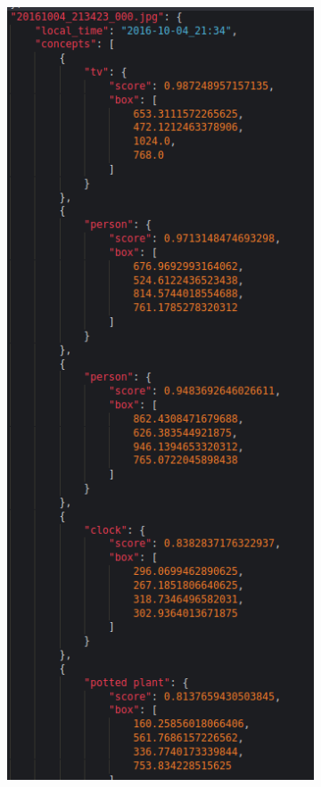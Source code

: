        
    \begin{figure}[H]
      \centering
      \captionsetup{justification=centering}
  
      \begin{subfigure}{0.3\textwidth}
      
      \includegraphics[width=\textwidth]{Sections/4InitialWork/4_images_random/res1.png} 

\end{subfigure}
\end{figure}
